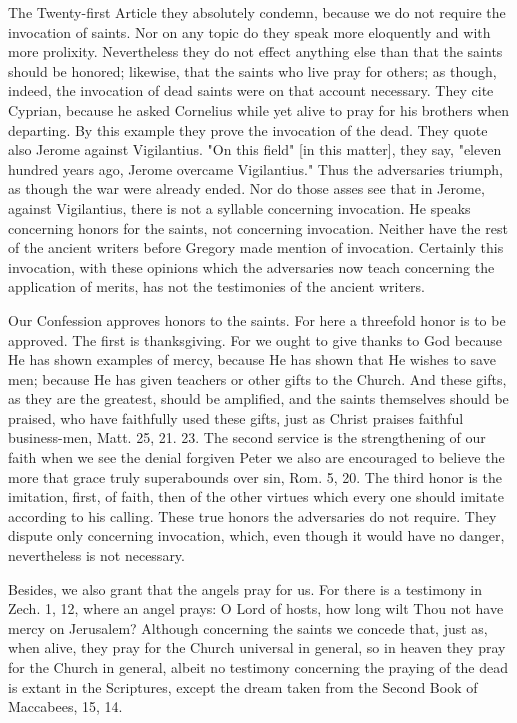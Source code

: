 The Twenty-first Article they absolutely condemn, because we do not
require the invocation of saints.  Nor on any topic do they speak
more eloquently and with more prolixity.  Nevertheless they do not
effect anything else than that the saints should be honored; likewise,
that the saints who live pray for others; as though, indeed, the
invocation of dead saints were on that account necessary.  They cite
Cyprian, because he asked Cornelius while yet alive to pray for his
brothers when departing.  By this example they prove the invocation
of the dead.  They quote also Jerome against Vigilantius.  "On this
field" [in this matter], they say, "eleven hundred years ago, Jerome
overcame Vigilantius." Thus the adversaries triumph, as though the
war were already ended.  Nor do those asses see that in Jerome,
against Vigilantius, there is not a syllable concerning invocation.
He speaks concerning honors for the saints, not concerning invocation.
Neither have the rest of the ancient writers before Gregory made
mention of invocation.  Certainly this invocation, with these
opinions which the adversaries now teach concerning the application
of merits, has not the testimonies of the ancient writers.

Our Confession approves honors to the saints.  For here a threefold
honor is to be approved.  The first is thanksgiving.  For we ought to
give thanks to God because He has shown examples of mercy, because He
has shown that He wishes to save men; because He has given teachers
or other gifts to the Church.  And these gifts, as they are the
greatest, should be amplified, and the saints themselves should be
praised, who have faithfully used these gifts, just as Christ praises
faithful business-men, Matt. 25, 21. 23. The second service is the
strengthening of our faith when we see the denial forgiven Peter we
also are encouraged to believe the more that grace truly superabounds
over sin, Rom. 5, 20. The third honor is the imitation, first, of
faith, then of the other virtues which every one should imitate
according to his calling.  These true honors the adversaries do not
require.  They dispute only concerning invocation, which, even though
it would have no danger, nevertheless is not necessary.

Besides, we also grant that the angels pray for us.  For there is a
testimony in Zech. 1, 12, where an angel prays: O Lord of hosts, how
long wilt Thou not have mercy on Jerusalem?  Although concerning the
saints we concede that, just as, when alive, they pray for the Church
universal in general, so in heaven they pray for the Church in
general, albeit no testimony concerning the praying of the dead is
extant in the Scriptures, except the dream taken from the Second Book
of Maccabees, 15, 14.

